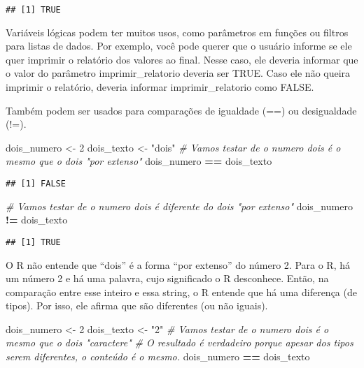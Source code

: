 \documentclass[
]{book}
\newenvironment{Shaded}{\begin{snugshade}}{\end{snugshade}}
\newcommand{\CommentTok}[1]{\textcolor[rgb]{0.56,0.35,0.01}{\textit{#1}}}
\newcommand{\DecValTok}[1]{\textcolor[rgb]{0.00,0.00,0.81}{#1}}
\newcommand{\NormalTok}[1]{#1}
\newcommand{\OperatorTok}[1]{\textcolor[rgb]{0.81,0.36,0.00}{\textbf{#1}}}
\newcommand{\StringTok}[1]{\textcolor[rgb]{0.31,0.60,0.02}{#1}}
\begin{document}
\begin{verbatim}
## [1] TRUE
\end{verbatim}

Variáveis lógicas podem ter muitos usos, como parâmetros em funções ou filtros para listas de dados. Por exemplo, você pode querer que o usuário informe se ele quer imprimir o relatório dos valores ao final. Nesse caso, ele deveria informar que o valor do parâmetro imprimir\_relatorio deveria ser TRUE. Caso ele não queira imprimir o relatório, deveria informar imprimir\_relatorio como FALSE.

Também podem ser usados para comparações de igualdade (==) ou desigualdade (!=).

\begin{Shaded}
\begin{Highlighting}[]
\NormalTok{dois_numero <-}\StringTok{ }\DecValTok{2}
\NormalTok{dois_texto <-}\StringTok{ "dois"}
\CommentTok{# Vamos testar de o numero dois é o mesmo que o dois "por extenso"}
\NormalTok{dois_numero }\OperatorTok{==}\StringTok{ }\NormalTok{dois_texto}
\end{Highlighting}
\end{Shaded}

\begin{verbatim}
## [1] FALSE
\end{verbatim}

\begin{Shaded}
\begin{Highlighting}[]
\CommentTok{# Vamos testar de o numero dois é diferente do dois "por extenso"}
\NormalTok{dois_numero }\OperatorTok{!=}\StringTok{ }\NormalTok{dois_texto}
\end{Highlighting}
\end{Shaded}

\begin{verbatim}
## [1] TRUE
\end{verbatim}

O R não entende que ``dois'' é a forma ``por extenso'' do número 2. Para o R, há um número 2 e há uma palavra, cujo significado o R desconhece. Então, na comparação entre esse inteiro e essa string, o R entende que há uma diferença (de tipos). Por isso, ele afirma que são diferentes (ou não iguais).

\begin{Shaded}
\begin{Highlighting}[]
\NormalTok{dois_numero <-}\StringTok{ }\DecValTok{2}
\NormalTok{dois_texto <-}\StringTok{ "2"}
\CommentTok{# Vamos testar de o numero dois é o mesmo que o dois "caractere"}
\CommentTok{# O resultado é verdadeiro porque apesar dos tipos serem diferentes, o conteúdo é o mesmo.}
\NormalTok{dois_numero }\OperatorTok{==}\StringTok{ }\NormalTok{dois_texto}
\end{Highlighting}
\end{Shaded}
\end{document}
